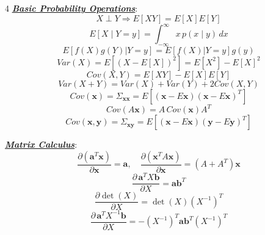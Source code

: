 \documentclass[12pt]{article}
\newcommand{\bulletPoint}[1]{\ul{\textit{\textbf{#1}}}}
\begin{document}
\begin{multicols*}{4}
\bulletPoint{Basic Probability Operations}:
\useshortskip \begin{equation*}
    X\perp Y \Rightarrow E[XY]=E[X]E[Y]
\end{equation*}
\useshortskip \begin{equation*}
    E[X\mid Y=y]=\int_{-\infty}^{\infty}x\,p(x\mid y)\,dx
\end{equation*}
\useshortskip \begin{equation*}
    \scriptstyle E[f(X)g(Y)|Y=y]=E[f(X)|Y=y]g(y)
\end{equation*}
\useshortskip \begin{equation*}
    Var(X)=E[(X-E[X])^2]=E[X^2]-E[X]^2
\end{equation*}
\useshortskip \begin{equation*}
    Cov(X,Y)=E[XY]-E[X]E[Y]
\end{equation*}
\useshortskip \begin{equation*}
    \scriptstyle Var(X+Y)=Var(X)+Var(Y)+2Cov(X,Y)
\end{equation*}
\useshortskip \begin{equation*}
    \scriptstyle Cov(\mathbf{x})=\Sigma_{\mathbf{x}\mathbf{x}}=E[(\mathbf{x}-E\mathbf{x})(\mathbf{x}-E\mathbf{x})^T]
\end{equation*}
\useshortskip \begin{equation*}
    Cov(A\mathbf{x})=A\,Cov(\mathbf{x})A^T
\end{equation*}
\useshortskip \begin{equation*}
    \scriptstyle Cov(\mathbf{x},\mathbf{y})=\Sigma_{\mathbf{x}\mathbf{y}}=E[(\mathbf{x}-E\mathbf{x})(\mathbf{y}-E\mathbf{y})^T]
\end{equation*}

\bulletPoint{Matrix Calculus}:
\useshortskip \begin{equation*}
    \frac{\partial(\mathbf{a}^T\mathbf{x})}{\partial\mathbf{x}}=\mathbf{a},\quad
    \frac{\partial(\mathbf{x}^T A\mathbf{x})}{\partial\mathbf{x}}=(A+A^T)\mathbf{x}
\end{equation*}
\useshortskip \begin{equation*}
    \frac{\partial\,\mathbf{a}^T X\mathbf{b}}{\partial X}=\mathbf{a}\mathbf{b}^T
\end{equation*}
\useshortskip \begin{equation*}
    \frac{\partial\det(X)}{\partial X}=\det(X)(X^{-1})^T
\end{equation*}
\useshortskip \begin{equation*}
    \scriptstyle \frac{\partial\,\mathbf{a}^TX^{-1}\mathbf{b}}{\partial X}=-(X^{-1})^T\mathbf{a}\mathbf{b}^T(X^{-1})^T
\end{equation*}


\end{multicols*}
\end{document}

